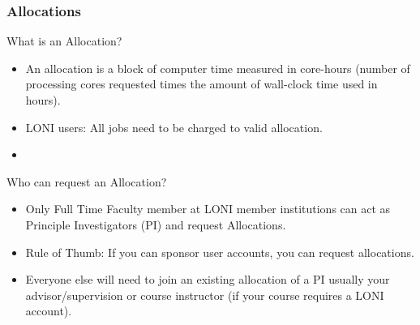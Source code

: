 \documentclass[slidestop,mathserif,compress,xcolor=svgnames,table]{beamer}
\newenvironment{bblock}[0]
{
\begin{beamerboxesrounded}[upper=uppercol1,lower=lowercol1,shadow=true]}
{\end{beamerboxesrounded}}
\begin{document}
\begin{frame}
  \frametitle{\small Allocations}
  \begin{bblock}{What is an Allocation?}
    {\footnotesize
      \begin{itemize}
        \item An allocation is a block of computer time measured in core-hours (number of processing cores requested times the amount of wall-clock time used in hours).
        \item LONI users: All jobs need to be charged to valid allocation.
        \item \color{red!90!black}{LSU HPC users: Allocations are coming soon when SuperMike II is put into production.}
      \end{itemize}
    }
  \end{bblock}
  \begin{bblock}{Who can request an Allocation?}
    {\footnotesize
      \begin{itemize}
        \item Only Full Time Faculty member at LONI member institutions can act as Principle Investigators (PI) and request Allocations.
        \item Rule of Thumb: If you can sponsor user accounts, you can request allocations.
        \item Everyone else will need to join an existing allocation of a PI usually your advisor/supervision or course instructor (if your course requires a LONI account). 
      \end{itemize}
    }
  \end{bblock}
\end{frame}
\end{document}
